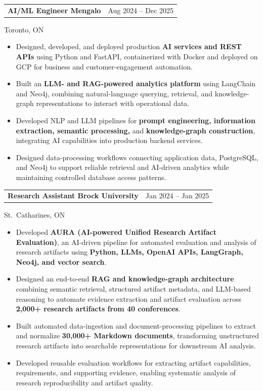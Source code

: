 \documentclass[10pt,letterpaper]{extarticle}
\makeatletter
\newcommand{\entry}[2]{%
  \vspace{2.5pt}%
  \noindent
  \begin{tabular*}{\textwidth}{@{}l@{\extracolsep{\fill}}r@{}}
    \textbf{#1} & {\color{muted}\small #2} \\
  \end{tabular*}
  \par\vspace{-1pt}%
}
\newcommand{\meta}[1]{%
  {\color{muted}\small #1}\par\vspace{1pt}%
}
\makeatother
\begin{document}
\entry{AI/ML Engineer \textnormal{\textbar} Mengalo}
{Aug 2024 -- Dec 2025}
\meta{Toronto, ON}

\begin{itemize}
\item Designed, developed, and deployed production \textbf{AI services and REST APIs} using Python and FastAPI, containerized with Docker and deployed on GCP for business and customer-engagement automation.

\item Built an \textbf{LLM- and RAG-powered analytics platform} using LangChain and Neo4j, combining natural-language querying, retrieval, and knowledge-graph representations to interact with operational data.

\item Developed NLP and LLM pipelines for \textbf{prompt engineering, information extraction, semantic processing,} and \textbf{knowledge-graph construction}, integrating AI capabilities into production backend services.

\item Designed data-processing workflows connecting application data, PostgreSQL, and Neo4j to support reliable retrieval and AI-driven analytics while maintaining controlled database access patterns.
\end{itemize}

\newpage
\entry{Research Assistant \textnormal{\textbar} Brock University}
{Jan 2024 -- Jan 2025}
\meta{St.\ Catharines, ON}

\begin{itemize}
\item Developed \textbf{AURA (AI-powered Unified Research Artifact Evaluation)}, an AI-driven pipeline for automated evaluation and analysis of research artifacts using \textbf{Python, LLMs, OpenAI APIs, LangGraph, Neo4j, and vector search}.

\item Designed an end-to-end \textbf{RAG and knowledge-graph architecture} combining semantic retrieval, structured artifact metadata, and LLM-based reasoning to automate evidence extraction and artifact evaluation across \textbf{2,000+ research artifacts from 40 conferences}.

\item Built automated data-ingestion and document-processing pipelines to extract and normalize \textbf{30,000+ Markdown documents}, transforming unstructured research artifacts into searchable representations for downstream AI analysis.

\item Developed reusable evaluation workflows for extracting artifact capabilities, requirements, and supporting evidence, enabling systematic analysis of research reproducibility and artifact quality.
\end{itemize}
\end{document}
